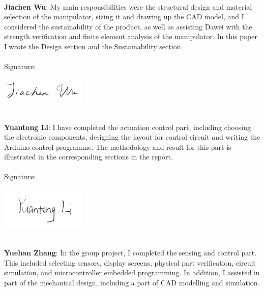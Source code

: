 \qquad \\
\noindent \textbf{Jiachen Wu}: My main responsibilities were the structural design and material selection of the manipulator, 
sizing it and drawing up the CAD model, and I considered the sustainability of the product, as well as assisting Dawei with 
the strength verification and finite element analysis of the manipulator. In this paper I wrote the Design section and the 
Sustainability section. \\
\qquad \\
\hspace*{\fill} Signature: \hrulefill
\vspace{-15mm}
\begin{center}
    \hspace{100mm}
    \includegraphics[width=4cm]{Image/Signature/wujc.png} 
\end{center}
\qquad \\
\noindent \textbf{Yuantong Li}: I have completed the actuation control part, including choosing the electronic components, 
designing the layout for control circuit and writing the Arduino control programme. The methodology and result for this part 
is illustrated in the corresponding sections in the report. \\
\qquad \\
\hspace*{\fill} Signature: \hrulefill
\vspace{-18mm}
\begin{center}
    \hspace{100mm}
    \includegraphics[width=4cm]{Image/Signature/liyt.png} 
\end{center}
\qquad \\
\noindent \textbf{Yuehan Zhang}: In the group project, I completed the sensing and control part. This included selecting 
sensors, display screens, physical part verification, circuit simulation, and microcontroller embedded programming.
In addition, I assisted in part of the mechanical design, including a part of CAD modelling and simulation. \\
\qquad \\
